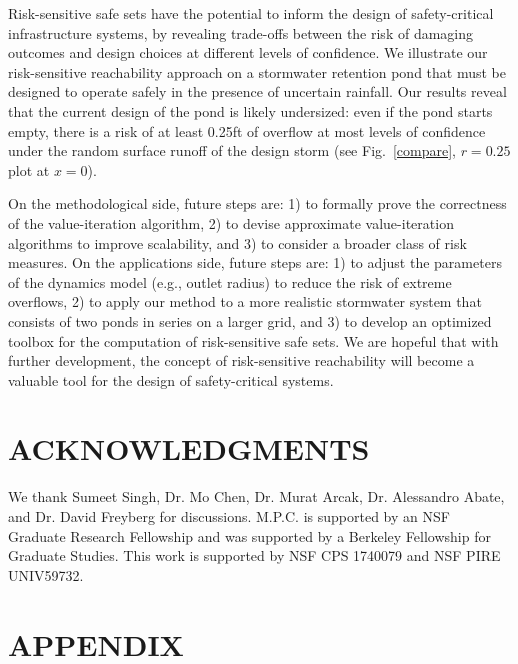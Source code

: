 \documentclass[letterpaper, 10 pt, conference]{ieeeconf}  %
\begin{document}
Risk-sensitive safe sets have the potential to inform the design of safety-critical infrastructure systems,
by revealing trade-offs between the risk of damaging outcomes and design choices at different levels of confidence.
We illustrate our risk-sensitive reachability approach on a stormwater retention pond that must be designed to operate safely in the presence of uncertain rainfall. 
Our results reveal that the current design of the pond is likely undersized: even if the pond starts empty, 
there is a risk of at least 0.25ft of overflow at most levels of confidence 
under the random surface runoff of the design storm (see Fig.~\ref{compare}, $r=0.25$ plot at $x=0$).

On the methodological side, future steps are: 1) to formally prove the correctness of the value-iteration algorithm, 
2) to devise approximate value-iteration algorithms to improve scalability, and 3) to consider a broader class of risk measures. 
On the applications side, future steps are: 1) to adjust the parameters of the dynamics model (e.g., outlet radius) to reduce the risk of extreme overflows, 
2) to apply our method to a more realistic stormwater system that consists of two ponds in series on a larger grid,
and 3) to develop an optimized toolbox for the computation of risk-sensitive safe sets.  
We are hopeful that with further development, the concept of risk-sensitive reachability will become a valuable tool for the design of safety-critical systems.

\section*{ACKNOWLEDGMENTS}
We thank Sumeet Singh, Dr. Mo Chen, Dr. Murat Arcak, Dr. Alessandro Abate, and Dr. David Freyberg for discussions. 
M.P.C. is supported by an NSF Graduate Research Fellowship and was supported by a Berkeley Fellowship for Graduate Studies. 
This work is supported by NSF CPS 1740079 and NSF PIRE UNIV59732.

\section*{APPENDIX}\label{appendix}
\end{document}
